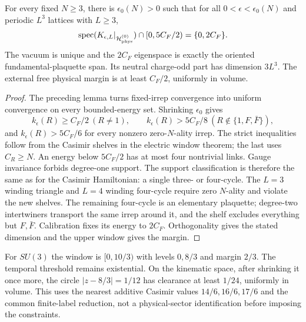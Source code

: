 \begin{theorem}
\label{thm:wilson-physical-window}
For every fixed $N\ge3$, there is $\epsilon_0(N)>0$ such that for all
$0<\epsilon<\epsilon_0(N)$ and periodic $L^3$ lattices with $L\ge3$,
\[
 \operatorname{spec}(K_{\epsilon,L}|_{\mathcal H_{\rm phys}^{(0)}})
 \cap[0,5C_F/2)=\{0,2C_F\}.
\]
The vacuum is unique and the $2C_F$ eigenspace is exactly the oriented
fundamental-plaquette span. Its neutral charge-odd part has dimension $3L^3$.
The external free physical margin is at least $C_F/2$, uniformly in volume.
\end{theorem}
\begin{proof}
The preceding lemma turns fixed-irrep convergence into uniform convergence
on every bounded-energy set. Shrinking $\epsilon_0$ gives
\[
 k_\epsilon(R)\ge C_F/2\ (R\ne1),\qquad
 k_\epsilon(R)>5C_F/8\ (R\notin\{1,F,\bar F\}),
\]
and $k_\epsilon(R)>5C_F/6$ for every nonzero zero-$N$-ality irrep.
The strict inequalities follow from the Casimir shelves in the electric
window theorem; the last uses $C_R\ge N$. An energy below $5C_F/2$ has
at most four nontrivial links. Gauge invariance forbids degree-one support.
The support classification is therefore the same as for the Casimir
Hamiltonian: a single three- or four-cycle. The $L=3$ winding triangle and
$L=4$ winding four-cycle require zero $N$-ality and violate the new shelves.
The remaining four-cycle is an elementary plaquette; degree-two intertwiners
transport the same irrep around it, and the shelf excludes everything but
$F,\bar F$. Calibration fixes its energy to $2C_F$. Orthogonality gives the
stated dimension and the upper window gives the margin.
\end{proof}
For $SU(3)$ the window is $[0,10/3)$ with levels $0,8/3$ and margin $2/3$.
The temporal threshold remains existential. On the kinematic space, after
shrinking it once more, the circle $|z-8/3|=1/12$ has clearance at least
$1/24$, uniformly in volume. This uses the nearest additive Casimir values
$14/6,16/6,17/6$ and the common finite-label reduction, not a physical-sector
identification before imposing the constraints.

